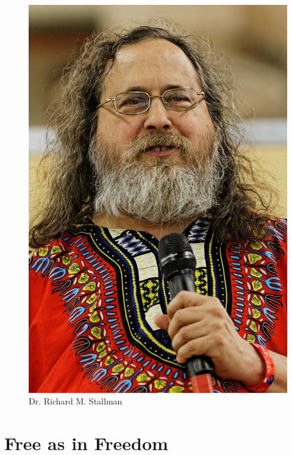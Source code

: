 \documentclass[12pt]{article}
\begin{document}
\begin{multicols}{3}
  \begin{figure}
  \includegraphics[width=\linewidth]{Images/Stallman.jpeg}
  \caption{\tiny Dr. Richard M. Stallman}
  \end{figure}

\section*{\small Free as in Freedom}


\end{multicols}
\end{document}
